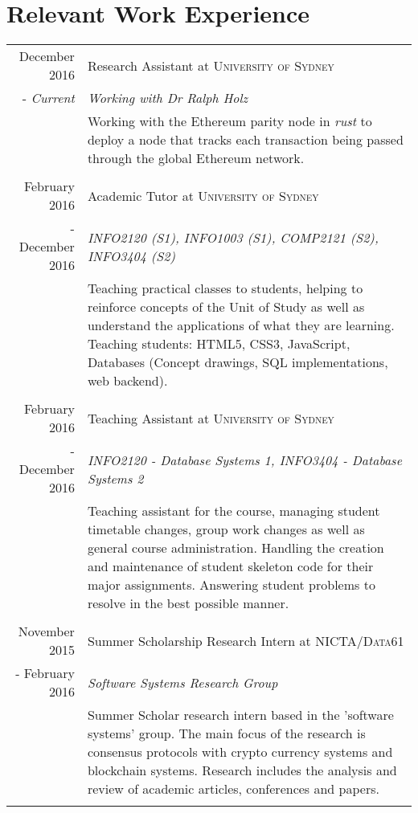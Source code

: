 \documentclass[10pt]{article}
\begin{document}
\section{Relevant Work Experience}
\begin{tabular}{r|p{11cm}}
December 2016 & Research Assistant at \textsc{University of Sydney} \\ - \emph{Current} & \emph{Working with Dr Ralph Holz}\\ & \footnotesize{Working with the Ethereum parity node in \emph{rust} to deploy a node that tracks each transaction being passed through the global Ethereum network.}\\\multicolumn{2}{c}{} \\
February 2016 & Academic Tutor at \textsc{University of Sydney} \\ - December 2016 & \emph{INFO2120 (S1), INFO1003 (S1), COMP2121 (S2), INFO3404 (S2)}\\&\footnotesize{Teaching practical classes to students, helping to reinforce concepts of the Unit of Study as well as understand the applications of what they are learning. Teaching students: HTML5, CSS3, JavaScript, Databases (Concept drawings, SQL implementations, web backend).}\\\multicolumn{2}{c}{} \\
February 2016 & Teaching Assistant at \textsc{University of Sydney} \\ - December 2016 &\emph{INFO2120 - Database Systems 1, INFO3404 - Database Systems 2}\\&\footnotesize{Teaching assistant for the course, managing student timetable changes, group work changes as well as general course administration. Handling the creation and maintenance of student skeleton code for their major assignments. Answering student problems to resolve in the best possible manner.}\\\multicolumn{2}{c}{} \\
November 2015 & Summer Scholarship Research Intern at \textsc{NICTA/Data61} \\ - February 2016 & \emph{Software Systems Research Group}\\&\footnotesize{Summer Scholar research intern based in the 'software systems' group. The main focus of the research is consensus protocols with crypto currency systems and blockchain systems. Research includes the analysis and review of academic articles, conferences and papers. }\\\multicolumn{2}{c}{}\\

\end{tabular}
\end{document}
